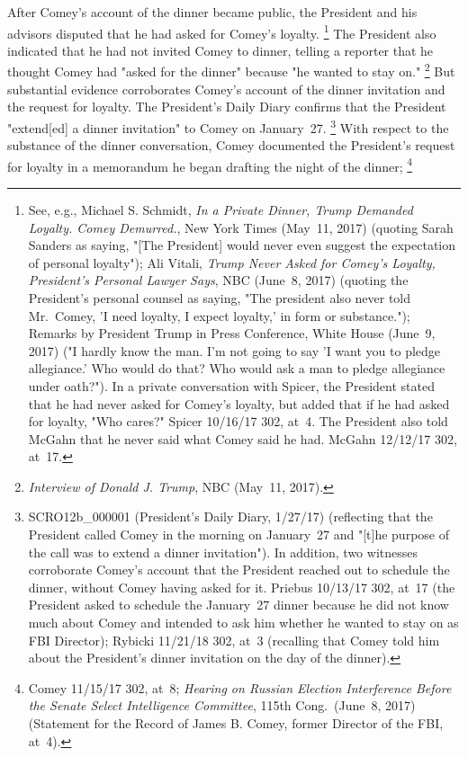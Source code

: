 After Comey's account of the dinner became public, the President and his advisors disputed that he had asked for Comey's loyalty.%
\footnote{See, e.g., Michael S. Schmidt, \textit{In a Private Dinner, Trump Demanded Loyalty. Comey Demurred.}, New York Times (May~11, 2017) (quoting Sarah Sanders as saying, "[The President] would never even suggest the expectation of personal loyalty");
Ali Vitali, \textit{Trump Never Asked for Comey's Loyalty, President's Personal Lawyer Says}, NBC (June~8, 2017) (quoting the President's personal counsel as saying, "The president also never told Mr.~Comey, 'I need loyalty, I expect loyalty,' in form or substance.");
Remarks by President Trump in Press Conference, White House (June~9, 2017) ("I hardly know the man.
I'm not going to say 'I want you to pledge allegiance.'
Who would do that?
Who would ask a man to pledge allegiance under oath?").
In a private conversation with Spicer, the President stated that he had never asked for Comey's loyalty, but added that if he had asked for loyalty, "Who cares?" Spicer 10/16/17 302, at~4.
The President also told McGahn that he never said what Comey said he had. McGahn 12/12/17 302, at~17.}
The President also indicated that he had not invited Comey to dinner, telling a reporter that he thought Comey had "asked for the dinner" because "he wanted to stay on."%
\footnote{\textit{Interview of Donald J. Trump}, NBC (May~11, 2017).}
But substantial evidence corroborates Comey's account of the dinner invitation and the request for loyalty.
The President's Daily Diary confirms that the President "extend[ed] a dinner invitation" to Comey on January~27.%
\footnote{SCRO12b\_000001 (President's Daily Diary, 1/27/17) (reflecting that the President called Comey in the morning on January~27 and "[t]he purpose of the call was to extend a dinner invitation").
In addition, two witnesses corroborate Comey's account that the President reached out to schedule the dinner, without Comey having asked for it.
Priebus 10/13/17 302, at~17 (the President asked to schedule the January~27 dinner because he did not know much about Comey and intended to ask him whether he wanted to stay on as FBI Director);
Rybicki 11/21/18 302, at~3 (recalling that Comey told him about the President's dinner invitation on the day of the dinner).}
With respect to the substance of the dinner conversation, Comey documented the President's request for loyalty in a memorandum he began drafting the night of the dinner;%
\footnote{Comey 11/15/17 302, at~8;
\textit{Hearing on Russian Election Interference Before the Senate Select Intelligence Committee}, 115th Cong.\ (June~8, 2017) (Statement for the Record of James B. Comey, former Director of the FBI, at~4).}
